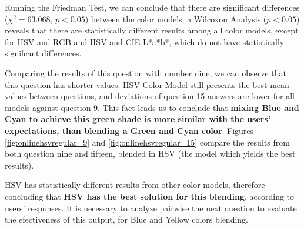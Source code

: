 %
Running the Friedman Test, we can conclude that there are significant differences ($\chi^2 = 63.068$, $p < 0.05$) between the color models; a Wilcoxon Analysis ($p < 0.05$) reveals that
there are statistically different results among all color models, except for \ul{HSV and RGB} and \ul{HSV and CIE-L*a*b*}, which do not have statistically signifcant differences. \par
%
Comparing the results of this question with number nine, we can observe that this question has shorter values: HSV Color Model still presents the best mean values between questions, and deviations of question 15
answers are lower for all models against question 9. This fact leads us to conclude that \textbf{mixing Blue and Cyan to achieve this green shade is more similar with the users' expectations, than blending a Green and
Cyan color}. Figures \ref{fig:onlinehsvregular_9} and \ref{fig:onlinehsvregular_15} compare the results from both question nine and fifteen, blended in HSV (the model which yields the best results). \par
%
HSV has statistically different results from other color models, therefore concluding that \textbf{HSV has the best solution for this blending}, according to users' responses. It is necessary to analyze
pairwise the next question to evaluate the efectiveness of this output, for Blue and Yellow colors blending. \par
%
